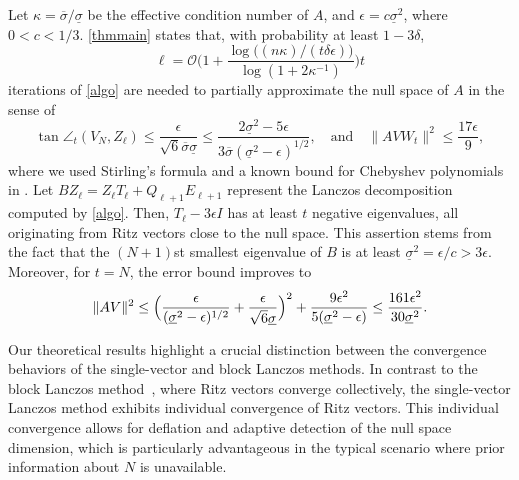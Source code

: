 \documentclass{siamart190516}
\newcommand{\order}{\mathcal{O}}
\providecommand{\norm}[1]{\lVert#1\rVert}
\begin{document}
\begin{remark}
    \label{cormain}
    Let $\kappa=\overline{\sigma}/\underline{\sigma}$ be the effective condition number of $A$, and $\epsilon=c\underline{\sigma}^{2}$, where $0<c<1/3$.
    \cref{thmmain} states that, with probability at least $1-3\delta$,
    \begin{equation*}
        \ell = \order\biggl(1+\frac{\log\bigl((n\kappa)/(t\delta\epsilon)\bigr)}{\log(1+2\kappa^{-1})}\biggr)t
    \end{equation*}
    iterations of \cref{algo} are needed to partially approximate the null space of $A$ in the sense of
    \begin{equation*}
        \tan\angle_{t}(V_{N},Z_{\ell}) \leq \frac{\epsilon}{\sqrt{6}\overline{\sigma}\underline{\sigma}}\leq \frac{2\underline{\sigma}^{2}-5\epsilon}{3\overline{\sigma}(\underline{\sigma}^{2}-\epsilon)^{1/2}},
        \quad\text{and}\quad 
        \norm{AVW_{t}}^{2}\leq \frac{17\epsilon}{9},
    \end{equation*}
    where we used Stirling's formula and a known bound for Chebyshev polynomials in \cite[Section~4.4.1]{Saad2011}. 
    Let $BZ_{\ell}=Z_{\ell}T_{\ell}+Q_{\ell+1}E_{\ell+1}$ represent the Lanczos decomposition computed by \cref{algo}. Then, $T_{\ell}-3\epsilon I$ has at least $t$ negative eigenvalues, all originating from Ritz vectors close to the null space. This assertion stems from the fact that the $(N + 1)$st smallest eigenvalue of $B$ is at least $\underline{\sigma}^{2}=\epsilon/c>3\epsilon$. Moreover, for $t=N$, the error bound improves to 
    \begin{equation*}
        \norm{AV}^{2}\leq \Bigl(\frac{\epsilon}{(\underline{\sigma}^{2}-\epsilon)^{1/2}}+\frac{\epsilon}{\sqrt{6}\underline{\sigma}}\Bigr)^{2}+\frac{9\epsilon^{2}}{5(\underline{\sigma}^{2}-\epsilon)} \leq \frac{161\epsilon^{2}}{30\underline{\sigma}^{2}}.
    \end{equation*}
\end{remark}

Our theoretical results highlight a crucial distinction between the convergence behaviors of the single-vector and block Lanczos methods. In contrast to the block Lanczos method~\cite{Li2015}, where Ritz vectors converge collectively, the single-vector Lanczos method exhibits individual convergence of Ritz vectors. 
This individual convergence allows for deflation and adaptive detection of the null space dimension, which is particularly advantageous in the typical scenario where prior information about $N$ is unavailable.
\end{document}
